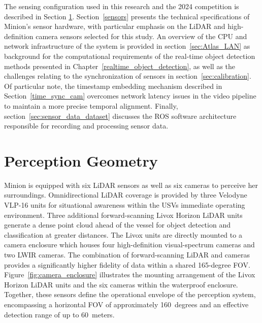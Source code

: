\documentclass{erauthesis}
\begin{document}
The sensing configuration used in this research and the 2024 competition is described in Section \ref{perception_geometry}.
Section~\ref{sensors} presents the technical specifications of Minion's sensor hardware, with particular emphasis on the \ac{LiDAR} and high-definition camera sensors selected for this study.
An overview of the CPU and network infrastructure of the system is provided in section~\ref{sec:Atlas_LAN} as background for the computational requirements of the real-time object detection methods presented in Chapter~\ref{realtime_object_detection}, as well as the challenges relating to the synchronization of sensors in section~\ref{sec:calibration}.
Of particular note, the timestamp embedding mechanism described in Section~\ref{time_sync_cam} overcomes network latency issues in the video pipeline to maintain a more precise temporal alignment.
Finally, section~\ref{sec:sensor_data_dataset} discusses the \ac{ROS} software architecture responsible for recording and processing sensor data.

\section{Perception Geometry} \label{perception_geometry}

Minion is equipped with six \ac{LiDAR} sensors as well as six cameras to perceive her surroundings.
Omnidirectional \ac{LiDAR} coverage is provided by three Velodyne VLP-16 units for situational awareness within the \acp{USV} immediate operating environment.
Three additional forward-scanning Livox Horizon \ac{LiDAR} units generate a dense point cloud ahead of the vessel for object detection and classification at greater distances.
The Livox units are directly mounted to a camera enclosure which houses four high-definition visual-spectrum cameras and two \ac{LWIR} cameras.
The combination of forward-scanning LiDAR and cameras provides a significantly higher fidelity of data within a shared 165-degree \ac{FOV}. %
Figure~\ref{fig:camera_enclosure} illustrates the mounting arrangement of the Livox Horizon LiDAR units and the six cameras within the waterproof enclosure.
Together, these sensors define the operational envelope of the perception system, encompassing a horizontal \ac{FOV} of approximately 160~degrees and an effective detection range of up to 60~meters.
\end{document}
